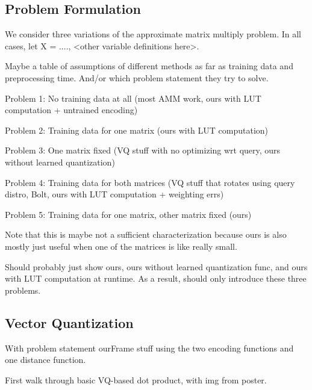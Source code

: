 
\subsection{Problem Formulation}

We consider three variations of the approximate matrix multiply problem. In all cases, let X = ...., <other variable definitions here>.

Maybe a table of assumptions of different methods as far as training data and preprocessing time. And/or which problem statement they try to solve.

Problem 1: No training data at all (most AMM work, ours with LUT computation + untrained encoding)

Problem 2: Training data for one matrix (ours with LUT computation)

Problem 3: One matrix fixed (VQ stuff with no optimizing wrt query, ours without learned quantization)

Problem 4: Training data for both matrices (VQ stuff that rotates using query distro, Bolt, ours with LUT computation + weighting errs)

Problem 5: Training data for one matrix, other matrix fixed (ours)


Note that this is maybe not a sufficient characterization because ours is also mostly just useful when one of the matrices is like really small.

Should probably just show ours, ours without learned quantization func, and ours with LUT computation at runtime. As a result, should only introduce these three problems.

\subsection{Vector Quantization}

With problem statement ourFrame stuff using the two encoding functions and one distance function.

First walk through basic VQ-based dot product, with img from poster.
